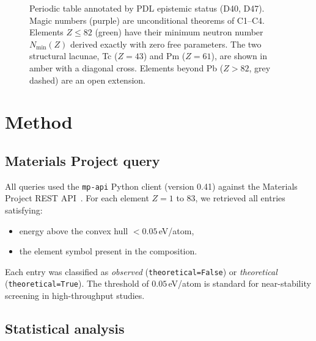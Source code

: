 \documentclass[11pt,a4paper]{article}
\theoremstyle{definition}
\theoremstyle{remark}
\begin{document}
\begin{figure}[H]
\caption{Periodic table annotated by PDL epistemic status (D40, D47). Magic numbers (purple) are unconditional theorems of C1--C4. Elements $Z\leq82$ (green) have their minimum neutron number $N_{\min}(Z)$ derived exactly with zero free parameters. The two structural lacunae, Tc ($Z=43$) and Pm ($Z=61$), are shown in amber with a diagonal cross. Elements beyond Pb ($Z>82$, grey dashed) are an open extension.}
\label{fig:ptable}
\end{figure}

\section{Method}
\label{sec:method}

\subsection{Materials Project query}

All queries used the \texttt{mp-api} Python client (version 0.41) against the Materials Project REST API~\cite{Jain_2013,Ong_2013}. For each element $Z=1$ to $83$, we retrieved all entries satisfying:
\begin{itemize}
  \item energy above the convex hull $< 0.05$\,eV/atom,
  \item the element symbol present in the composition.
\end{itemize}
Each entry was classified as \emph{observed} (\texttt{theoretical=False}) or \emph{theoretical} (\texttt{theoretical=True}). The threshold of $0.05$\,eV/atom is standard for near-stability screening in high-throughput studies.

\subsection{Statistical analysis}
\end{document}
